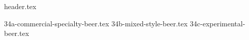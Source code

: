 \clearpage
{}
\divisorLine

{header.tex}

\begin{multicols}{2}

{34a-commercial-specialty-beer.tex}
{34b-mixed-style-beer.tex}
{34c-experimental-beer.tex}

\end{multicols}